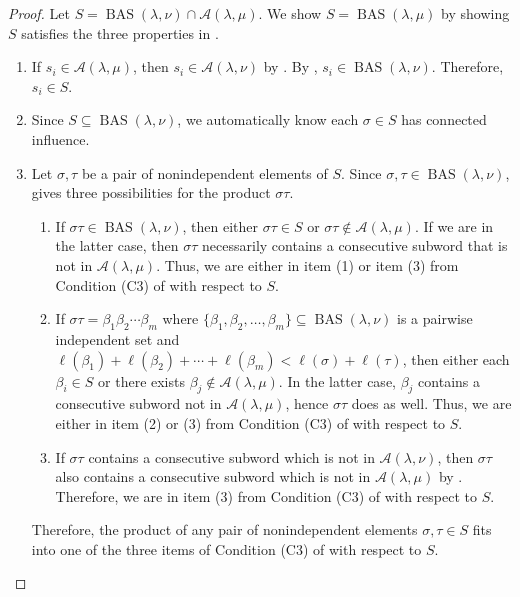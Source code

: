 \documentclass{amsart}
\theoremstyle{definition}
\DeclareMathOperator{\BAS}{BAS}
\begin{document}
\begin{proof}
Let $S = \BAS(\lambda,\nu) \cap \mathcal{A}(\lambda,\mu)$. We show $S = \BAS(\lambda,\mu)$ by showing $S$ satisfies the three properties in .
\begin{enumerate}
    \item[(C1)]  If $s_i \in\mathcal{A}(\lambda,\mu)$, then 
    $s_i \in \mathcal{A}(\lambda,\nu)$
    by .
    By , $s_i \in \BAS(\lambda,\nu)$. Therefore, $s_i \in S$. 
    \item[(C2)] Since $S \subseteq \BAS(\lambda,\nu)$, we automatically know each $\sigma \in S$ has connected influence. 
    \item[(C3)] Let $\sigma,\tau$ be a pair of nonindependent elements of $S$. Since $\sigma,\tau \in \BAS(\lambda,\nu)$,  gives three possibilities for the product $\sigma\tau$.
    \begin{enumerate}[(1)]
        \item If $\sigma\tau \in \BAS(\lambda,\nu)$, then either $\sigma\tau \in S$ or $\sigma\tau \notin \mathcal{A}(\lambda,\mu)$. If we are in the latter case, then $\sigma\tau$ necessarily contains a consecutive subword that is not in $\mathcal{A}(\lambda,\mu)$. Thus, we are either in item (1) or item (3) from Condition (C3) of  with respect to $S$.
        \item If $\sigma\tau = \beta_1\beta_2 \cdots \beta_m$ where $\{\beta_1,\beta_2,\ldots,\beta_m\} \subseteq \BAS(\lambda,\nu)$ is a pairwise independent set and $\ell(\beta_1) + \ell(\beta_2) + \cdots + \ell(\beta_m) < \ell(\sigma) + \ell(\tau)$, then either each $\beta_i \in S$ or there exists $\beta_j \notin \mathcal{A}(\lambda,\mu)$.  In the latter case, $\beta_j$ contains a consecutive subword not in $\mathcal{A}(\lambda,\mu)$, hence $\sigma\tau$ does as well. Thus, we are either in item (2) or (3) from Condition (C3) of  with respect to $S$.
        \item If $\sigma \tau$ contains a consecutive subword which is not in $\mathcal{A}(\lambda,\nu)$, then
        $\sigma \tau$ also contains a consecutive subword which is not in $\mathcal{A}(\lambda,\mu)$ by . Therefore, we are in item (3) from Condition (C3) of  with respect to $S$.
    \end{enumerate} 
    Therefore, the product of any pair of nonindependent elements $\sigma,\tau \in S$ fits into one of the three items of Condition (C3) of  with respect to $S$. \qedhere 
\end{enumerate}
\end{proof} 
\end{document}
